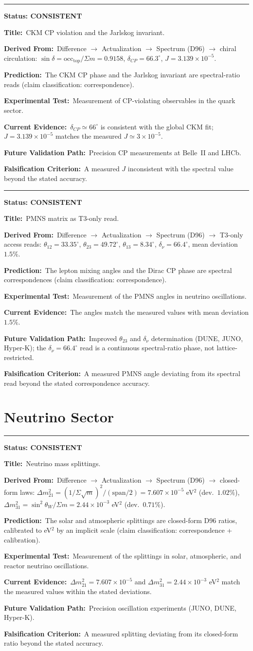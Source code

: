 \documentclass[11pt,a4paper]{article}
\newcommand{\predstart}[2]{%
  \par\medskip\noindent\hrule\par\smallskip
  \noindent{\large\bfseries #1}\hfill{\bfseries Status: #2}\par\smallskip
}
\newcommand{\pfield}[2]{%
  \noindent\textbf{#1:}~#2\par\smallskip
}
\begin{document}
\predstart{AT-P006}{CONSISTENT}
\pfield{Title}{CKM CP violation and the Jarlskog invariant.}
\pfield{Derived From}{Difference $\to$ Actualization $\to$ Spectrum (D96) $\to$ chiral
circulation: $\sin\delta = \mathrm{occ}_{\mathrm{top}}/\Sigma m = 0.9158$,
$\delta_{CP} = 66.3^\circ$, $J = 3.139\times10^{-5}$.}
\pfield{Prediction}{The CKM CP phase and the Jarlskog invariant are spectral-ratio reads
(claim classification: correspondence).}
\pfield{Experimental Test}{Measurement of CP-violating observables in the quark sector.}
\pfield{Current Evidence}{$\delta_{CP} \simeq 66^\circ$ is consistent with the global CKM
fit; $J = 3.139\times10^{-5}$ matches the measured $J \simeq 3\times10^{-5}$.}
\pfield{Future Validation Path}{Precision CP measurements at Belle~II and LHCb.}
\pfield{Falsification Criterion}{A measured $J$ inconsistent with the spectral value beyond
the stated accuracy.}

\predstart{AT-P007}{CONSISTENT}
\pfield{Title}{PMNS matrix as T3-only read.}
\pfield{Derived From}{Difference $\to$ Actualization $\to$ Spectrum (D96) $\to$ T3-only
access reads: $\theta_{12} = 33.35^\circ$, $\theta_{23} = 49.72^\circ$,
$\theta_{13} = 8.34^\circ$, $\delta_\nu = 66.4^\circ$, mean deviation $1.5\%$.}
\pfield{Prediction}{The lepton mixing angles and the Dirac CP phase are spectral
correspondences (claim classification: correspondence).}
\pfield{Experimental Test}{Measurement of the PMNS angles in neutrino oscillations.}
\pfield{Current Evidence}{The angles match the measured values with mean deviation $1.5\%$.}
\pfield{Future Validation Path}{Improved $\theta_{23}$ and $\delta_\nu$ determination
(DUNE, JUNO, Hyper-K); the $\delta_\nu = 66.4^\circ$ read is a continuous spectral-ratio
phase, not lattice-restricted.}
\pfield{Falsification Criterion}{A measured PMNS angle deviating from its spectral read
beyond the stated correspondence accuracy.}

\section{Neutrino Sector}
\label{sec:neutrino}

\predstart{AT-P008}{CONSISTENT}
\pfield{Title}{Neutrino mass splittings.}
\pfield{Derived From}{Difference $\to$ Actualization $\to$ Spectrum (D96) $\to$ closed-form
laws: $\Delta m^2_{21} = (1/\Sigma\sqrt{m})^2/(\mathrm{span}/2) = 7.607\times10^{-5}$
eV$^2$ (dev.\ $1.02\%$), $\Delta m^2_{31} = \sin^2\theta_W/\Sigma m = 2.44\times10^{-3}$
eV$^2$ (dev.\ $0.71\%$).}
\pfield{Prediction}{The solar and atmospheric splittings are closed-form D96 ratios,
calibrated to eV$^2$ by an implicit scale (claim classification: correspondence +
calibration).}
\pfield{Experimental Test}{Measurement of the splittings in solar, atmospheric, and reactor
neutrino oscillations.}
\pfield{Current Evidence}{$\Delta m^2_{21} = 7.607\times10^{-5}$ and
$\Delta m^2_{31} = 2.44\times10^{-3}$ eV$^2$ match the measured values within the stated
deviations.}
\pfield{Future Validation Path}{Precision oscillation experiments (JUNO, DUNE, Hyper-K).}
\pfield{Falsification Criterion}{A measured splitting deviating from its closed-form ratio
beyond the stated accuracy.}
\end{document}
